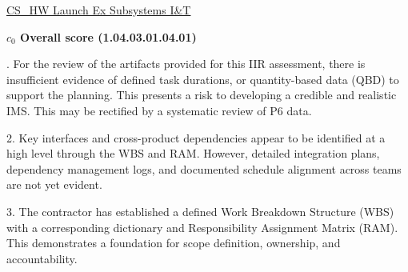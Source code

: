 % 


\begin{frame}{\href{run:../local/source-docs/1.04.03.01.04.01.pdf}{CS\_HW Launch Ex Subsystems I\&T}}
\centering
{}
\par
\vspace{0.75em}
\textbf{\small{\(c_0\) Overall score {\tiny (1.04.03.01.04.01)}}}\\\par
\vspace{0.5em}
\begin{minipage}{0.85\textwidth}
\raggedright
\fontsize{7}{9}. For the review of the artifacts provided for this IIR assessment, there is insufficient evidence of defined task durations, or quantity-based data (QBD) to support the planning. This presents a risk to developing a credible and realistic IMS. This may be rectified by a systematic review of P6 data.\par\vspace{0.5em}2. Key interfaces and cross-product dependencies appear to be identified at a high level through the WBS and RAM. However, detailed integration plans, dependency management logs, and documented schedule alignment across teams are not yet evident.\par\vspace{0.5em}3. The contractor has established a defined Work Breakdown Structure (WBS) with a corresponding dictionary and Responsibility Assignment Matrix (RAM). This demonstrates a foundation for scope definition, ownership, and accountability.\par
\end{minipage}
\end{frame}
